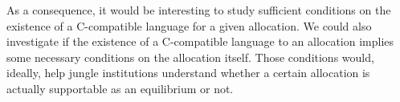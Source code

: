 \vspace{3mm}

As a consequence, it would be interesting to study sufficient conditions on the existence of a C-compatible language for a given allocation. We could also investigate if the existence of a C-compatible language to an allocation implies some necessary conditions on the allocation itself. Those conditions would, ideally, help jungle institutions understand whether a certain allocation is actually supportable as an equilibrium or not.



\newpage






